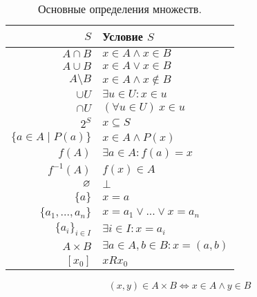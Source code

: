 \begin{table}
  \centering
  \begin{tabular}{r|l}
    $S$                        & Условие $S$                        \\\hline
    $A\cap B$                  & $x\in A\land x\in B$               \\
    $A\cup B$                  & $x\in A\lor x\in B$                \\
    $A\setminus B$             & $x\in A \land x\notin B$           \\
    $\cup U$                   & $\exists u\in U:x\in u$            \\
    $\cap U$                   & $(\forall u\in U)~x\in u$          \\
    $2^{S}$                    & $x\subseteq S$                     \\
    $\{a\in A\;\big|\; P(a)\}$ & $x\in A\land P(x)$                 \\
    $f(A)$                     & $\exists a\in A:f(a)=x$            \\
    $f^{-1}(A)$                & $f(x)\in A$                        \\
    $\varnothing$                    & $\bot$                             \\
    $\{a\}$                    & $x=a$                              \\
    $\{a_1,...,a_{n}\}$        & $x=a_1\lor ...\lor x=a_{n}$        \\
    $\{a_{i}\}_{i\in I}$       & $\exists i\in I:x=a_{i}$           \\
    $A\times B$                & $\exists a\in A,b\in B:x=(a,b)$    \\
    $[x_0]$                    & $xRx_0$
  \end{tabular}

  \[
    (x,y)\in A\times B\iff x\in A\land y\in B
  \]

  \caption{Основные определения множеств.}\label{table:set_def}
\end{table}
